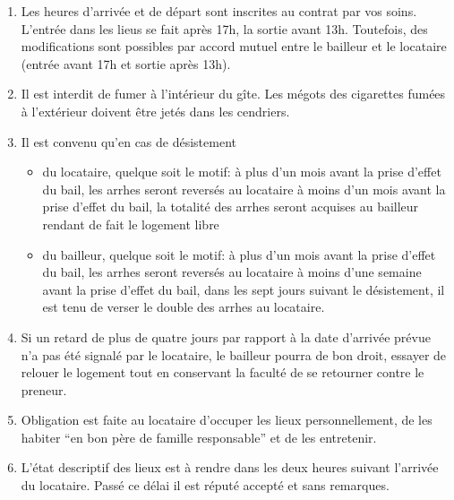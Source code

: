 \documentclass[a4paper,11pt]{article}
\begin{document}
\begin{enumerate}

\item Les heures d’arrivée et de départ sont inscrites  au contrat par vos soins.
L'entrée dans les lieus se fait après 17h, la sortie avant 13h. Toutefois, des modifications sont possibles par accord mutuel entre le bailleur et le locataire (entrée avant 17h et sortie après 13h).
 


\item Il est interdit de fumer à l’intérieur du gîte. Les mégots des cigarettes fumées à l'extérieur doivent être jetés dans les cendriers.

\item Il est convenu qu'en cas de désistement \\


\begin{itemize}
\item du locataire, quelque soit le motif:
\subitem à plus d'un mois avant la prise d'effet du bail, les arrhes seront reversés au locataire
\subitem à moins d'un mois avant la prise d'effet du bail, la totalité des arrhes seront acquises au bailleur rendant de fait le logement libre
\item du bailleur, quelque soit le motif:
\subitem à plus d'un mois avant la prise d'effet du bail, les arrhes seront reversés au locataire
\subitem à moins d'une semaine avant la prise d'effet du bail, dans les sept jours suivant le désistement, il est tenu de verser le double des arrhes au locataire.
\end{itemize}



\item Si un retard de plus de quatre jours par rapport à la date d’arrivée prévue n’a pas été signalé par le locataire, le bailleur pourra de bon droit, essayer de relouer le logement tout en conservant la faculté de se retourner contre le preneur.



\item Obligation est faite au locataire d’occuper les lieux personnellement, de les habiter “en bon père de famille responsable” et de les entretenir.

\item L'état descriptif des lieux est à rendre dans les deux heures suivant l'arrivée du locataire. Passé ce délai il est réputé accepté et sans remarques.



\end{enumerate}
\end{document}
